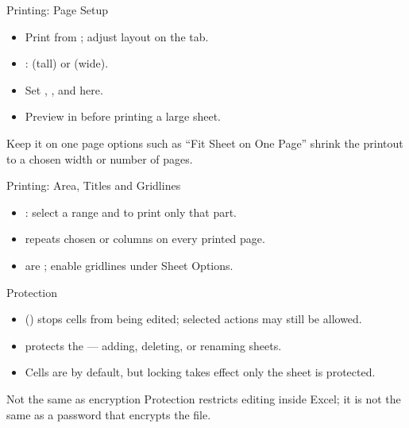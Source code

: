 \documentclass[aspectratio=169]{beamer}
\begin{document}
\begin{frame}{Printing: Page Setup}
  \begin{itemize}
    \item Print from ; adjust layout on the 
      tab.
    \item {}:  (tall) or  (wide).
    \item Set , , and  here.
    \item Preview in  before printing a large sheet.
  \end{itemize}
  \begin{block}{Keep it on one page}
     options such as ``Fit Sheet on One Page'' shrink the printout
    to a chosen width or number of pages.
  \end{block}
\end{frame}

\begin{frame}{Printing: Area, Titles and Gridlines}
  \begin{itemize}
    \item {}: select a range and  to print
      only that part.
    \item {} repeats chosen  or columns on every
      printed page.
    \item {} are ; enable
       gridlines under Sheet Options.
  \end{itemize}
\end{frame}

\begin{frame}{Protection}
  \begin{itemize}
    \item {} () stops cells from
      being edited; selected actions may still be allowed.
    \item {} protects the  --- adding,
      deleting, or renaming sheets.
    \item Cells are  by default, but locking takes effect only
       the sheet is protected.
  \end{itemize}
  \begin{alertblock}{Not the same as encryption}
    Protection restricts editing inside Excel; it is not the same as a password
    that encrypts the file.
  \end{alertblock}
\end{frame}
\end{document}
